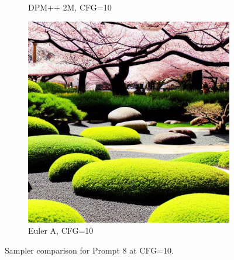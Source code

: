 \documentclass[10pt,twocolumn]{article}
\begin{document}
\begin{figure}[H]
\begin{subfigure}{0.32\textwidth}
        \caption{DPM++ 2M, CFG=10}
    \end{subfigure}
    \begin{subfigure}{0.32\textwidth}
        \includegraphics[width=\linewidth]{figures/baseline_euler_a_cfg10.0_512_prompt8_20250712_111648.png}
        \caption{Euler A, CFG=10}
    \end{subfigure}
    \caption{Sampler comparison for Prompt 8 at CFG=10.}
\end{figure}
\end{document}
